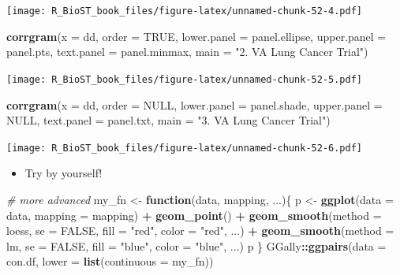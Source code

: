 \documentclass[
]{book}
\newenvironment{Shaded}{\begin{snugshade}}{\end{snugshade}}
\newcommand{\CommentTok}[1]{\textcolor[rgb]{0.56,0.35,0.01}{\textit{#1}}}
\newcommand{\ControlFlowTok}[1]{\textcolor[rgb]{0.13,0.29,0.53}{\textbf{#1}}}
\newcommand{\DataTypeTok}[1]{\textcolor[rgb]{0.13,0.29,0.53}{#1}}
\newcommand{\KeywordTok}[1]{\textcolor[rgb]{0.13,0.29,0.53}{\textbf{#1}}}
\newcommand{\NormalTok}[1]{#1}
\newcommand{\OperatorTok}[1]{\textcolor[rgb]{0.81,0.36,0.00}{\textbf{#1}}}
\newcommand{\OtherTok}[1]{\textcolor[rgb]{0.56,0.35,0.01}{#1}}
\newcommand{\StringTok}[1]{\textcolor[rgb]{0.31,0.60,0.02}{#1}}
\providecommand{\tightlist}{%
  \setlength{\itemsep}{0pt}\setlength{\parskip}{0pt}}
\begin{document}
\texttt{[image: R\_BioST\_book\_files/figure-latex/unnamed-chunk-52-4.pdf]}

\begin{Shaded}
\begin{Highlighting}[]
\KeywordTok{corrgram}\NormalTok{(}\DataTypeTok{x =}\NormalTok{ dd, }
         \DataTypeTok{order =} \OtherTok{TRUE}\NormalTok{, }
         \DataTypeTok{lower.panel =}\NormalTok{ panel.ellipse, }
         \DataTypeTok{upper.panel =}\NormalTok{ panel.pts, }
         \DataTypeTok{text.panel =}\NormalTok{ panel.minmax, }
         \DataTypeTok{main =} \StringTok{"2. VA Lung Cancer Trial"}\NormalTok{)}
\end{Highlighting}
\end{Shaded}

\texttt{[image: R\_BioST\_book\_files/figure-latex/unnamed-chunk-52-5.pdf]}

\begin{Shaded}
\begin{Highlighting}[]
\KeywordTok{corrgram}\NormalTok{(}\DataTypeTok{x =}\NormalTok{ dd, }
         \DataTypeTok{order =} \OtherTok{NULL}\NormalTok{, }
         \DataTypeTok{lower.panel =}\NormalTok{ panel.shade, }
         \DataTypeTok{upper.panel =} \OtherTok{NULL}\NormalTok{, }
         \DataTypeTok{text.panel =}\NormalTok{ panel.txt, }
         \DataTypeTok{main =} \StringTok{"3. VA Lung Cancer Trial"}\NormalTok{)}
\end{Highlighting}
\end{Shaded}

\texttt{[image: R\_BioST\_book\_files/figure-latex/unnamed-chunk-52-6.pdf]}

\begin{itemize}
\tightlist
\item
  Try by yourself!
\end{itemize}

\begin{Shaded}
\begin{Highlighting}[]
\CommentTok{\# more advanced}
\NormalTok{my\_fn \textless{}{-}}\StringTok{ }\ControlFlowTok{function}\NormalTok{(data, mapping, ...)\{}
\NormalTok{  p \textless{}{-}}\StringTok{ }\KeywordTok{ggplot}\NormalTok{(}\DataTypeTok{data =}\NormalTok{ data, }\DataTypeTok{mapping =}\NormalTok{ mapping) }\OperatorTok{+}\StringTok{ }
\StringTok{    }\KeywordTok{geom\_point}\NormalTok{() }\OperatorTok{+}\StringTok{ }
\StringTok{    }\KeywordTok{geom\_smooth}\NormalTok{(}\DataTypeTok{method =}\NormalTok{ loess, }\DataTypeTok{se =} \OtherTok{FALSE}\NormalTok{, }\DataTypeTok{fill =} \StringTok{"red"}\NormalTok{, }\DataTypeTok{color =} \StringTok{"red"}\NormalTok{, ...) }\OperatorTok{+}
\StringTok{    }\KeywordTok{geom\_smooth}\NormalTok{(}\DataTypeTok{method =}\NormalTok{ lm, }\DataTypeTok{se =} \OtherTok{FALSE}\NormalTok{, }\DataTypeTok{fill =} \StringTok{"blue"}\NormalTok{, }\DataTypeTok{color =} \StringTok{"blue"}\NormalTok{, ...)}
\NormalTok{  p}
\NormalTok{\}}
\NormalTok{GGally}\OperatorTok{::}\KeywordTok{ggpairs}\NormalTok{(}\DataTypeTok{data =}\NormalTok{ con.df, }
        \DataTypeTok{lower =} \KeywordTok{list}\NormalTok{(}\DataTypeTok{continuous =}\NormalTok{ my\_fn))}
\end{Highlighting}
\end{Shaded}
\end{document}
